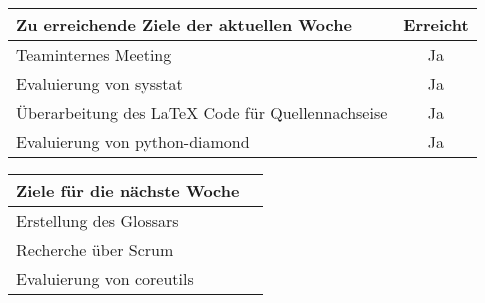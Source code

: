 \begin{tabularx}{\textwidth}{Xc}
    \arrayrulecolor{OliveGreen}
    \toprule
    {\bfseries Zu erreichende Ziele der aktuellen Woche} & {\bfseries Erreicht} \\
    \midrule[2pt]
    Teaminternes Meeting                                 &Ja                    \\
    \rowcolor{OliveGreen!15}
    Evaluierung von sysstat                              &Ja                    \\
    \rowcolor{White}
    Überarbeitung des \LaTeX{} Code für  Quellennachseise &Ja                    \\
    \rowcolor{OliveGreen!15}
    Evaluierung von python-diamond                       &Ja                    \\
    \bottomrule[2pt]
\end{tabularx}
%
\vspace{1cm}
%
\begin{tabularx}{\textwidth}{Xc}
    \arrayrulecolor{OliveGreen}
    \toprule
    {\bfseries Ziele für die nächste Woche}              &                      \\
    \midrule[2pt]
    Erstellung des Glossars                            &                      \\
    \rowcolor{OliveGreen!15}
    Recherche über Scrum                 &                      \\
    \rowcolor{White}
    Evaluierung von coreutils  & \\
\end{tabularx}
